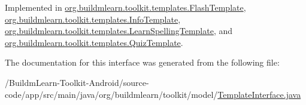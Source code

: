 Implemented in \hyperlink{classorg_1_1buildmlearn_1_1toolkit_1_1templates_1_1FlashTemplate_ada55d7e95306576dd3a2f30183c3fc1e}{org.\-buildmlearn.\-toolkit.\-templates.\-Flash\-Template}, \hyperlink{classorg_1_1buildmlearn_1_1toolkit_1_1templates_1_1InfoTemplate_ada0d67fc9e941bb29703a19467216a92}{org.\-buildmlearn.\-toolkit.\-templates.\-Info\-Template}, \hyperlink{classorg_1_1buildmlearn_1_1toolkit_1_1templates_1_1LearnSpellingTemplate_ab644415ca83560eecd107a9d2a22e65b}{org.\-buildmlearn.\-toolkit.\-templates.\-Learn\-Spelling\-Template}, and \hyperlink{classorg_1_1buildmlearn_1_1toolkit_1_1templates_1_1QuizTemplate_a775355616317bb56fd8adf0962d7e05b}{org.\-buildmlearn.\-toolkit.\-templates.\-Quiz\-Template}.



The documentation for this interface was generated from the following file\-:\begin{DoxyCompactItemize}
\item 
/\-Buildm\-Learn-\/\-Toolkit-\/\-Android/source-\/code/app/src/main/java/org/buildmlearn/toolkit/model/\hyperlink{TemplateInterface_8java}{Template\-Interface.\-java}\end{DoxyCompactItemize}
